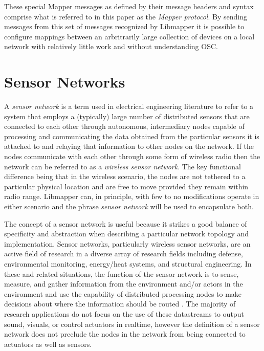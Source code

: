These special Mapper messages as defined by their message headers and syntax comprise what is referred to in this paper as the \emph{Mapper protocol}. By sending messages from this set of messages recognized by Libmapper it is possible to configure mappings between an arbritrarily large collection of devices on a local network with relatively little work and without understanding OSC.

\section{Sensor Networks}

A \emph{sensor network} is a term used in electrical engineering literature to refer to a system that employs a (typically) large number of distributed sensors that are connected to each other through autonomous, intermediary nodes capable of processing and communicating the data obtained from the particular sensors it is attached to and relaying that information to other nodes on the network. If the nodes communicate with each other through some form of wireless radio then the network can be referred to as a \emph{wireless sensor network}. The key functional difference being that in the wireless scenario, the nodes are not tethered to a particular physical location and are free to move provided they remain within radio range. Libmapper can, in principle, with few to no modifications operate in either scenario and the phrase \emph{sensor network} will be used to encapsulate both.

The concept of a sensor network is useful because it strikes a good balance of specificity and abstraction when describing a particular network topology and implementation. Sensor networks, particularly wireless sensor networks, are an active field of research in a diverse array of research fields including defense, environmental monitoring, energy/heat systems, and structural engineering. In these and related situations, the function of the sensor network is to sense, measure, and gather information from the environment and/or actors in the environment and use the capability of distributed processing nodes to make decisions about where the information should be routed \cite{survey2008}. The majority of research applications do not focus on the use of these datastreams to output sound, visuals, or control actuators in realtime, however the definition of a sensor network does not preclude the nodes in the network from being connected to actuators as well as sensors.

